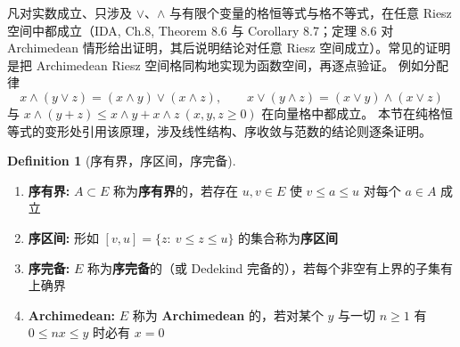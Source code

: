 \documentclass[oneside]{book}
\theoremstyle{definition}
\newtheorem*{properties}{Properties}
\newcommand{\R}{\mathbb{R}}
\theoremstyle{definition}
\newtheorem{definition}{Definition}[section]
\begin{document}
	
	\begin{note}
		凡对实数成立、只涉及 $\vee$、$\wedge$ 与有限个变量的格恒等式与格不等式，在任意 Riesz 空间中都成立（IDA, Ch.8, Theorem 8.6 与 Corollary 8.7；定理 8.6 对 Archimedean 情形给出证明，其后说明结论对任意 Riesz 空间成立）。常见的证明是把 Archimedean Riesz 空间格同构地实现为函数空间，再逐点验证。
		例如分配律
		\[
		x\wedge(y\vee z)=(x\wedge y)\vee(x\wedge z),\qquad x\vee(y\wedge z)=(x\vee y)\wedge(x\vee z)
		\]
		与 $x\wedge(y+z)\leqslant x\wedge y+x\wedge z\ (x,y,z\geqslant0)$ 在向量格中都成立。
		本节在纯格恒等式的变形处引用该原理，涉及线性结构、序收敛与范数的结论则逐条证明。
	\end{note}
	
%	
%		
	\begin{definition}[序有界，序区间，序完备]
		\leavevmode\par
		\begin{enumerate}
			\item \textbf{序有界: }$A\subset E$ 称为\textbf{序有界}的，若存在 $u,v\in E$ 使 $v\leqslant a\leqslant u$ 对每个 $a\in A$ 成立
			\item \textbf{序区间: }形如 $[v,u]=\{z:\ v\leqslant z\leqslant u\}$ 的集合称为\textbf{序区间}
			\item \textbf{序完备: }$E$ 称为\textbf{序完备}的（或 Dedekind 完备的），若每个非空有上界的子集有上确界
			\item \textbf{Archimedean: }$E$ 称为 \textbf{Archimedean} 的，若对某个 $y$ 与一切 $n\geqslant1$ 有 $0\leqslant nx\leqslant y$ 时必有 $x=0$
		\end{enumerate}
	\end{definition}
	
\end{document}
